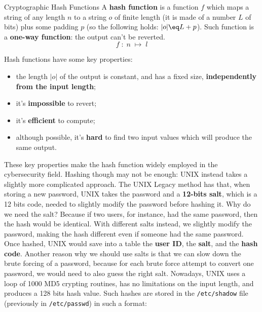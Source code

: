 \begin{definition}{Cryptographic Hash Functions}
    A \textbf{hash function} is a function $f$ which maps a string of any length $n$ to a string $o$ of finite length (it is made of a number $L$ of bits) plus some padding $p$ (so the following holds: $|o| \eq L + p$). Such function is a \textbf{one-way function}: the output can't be reverted.
    \[ f \; : \; n \; \longmapsto \; l \]
\end{definition}

Hash functions have some key properties:
\begin{itemize}
    \item the length $|o|$ of the output is constant, and has a fixed size, \textbf{independently from the input length};
    \item it's \textbf{impossible} to revert;
    \item it's \textbf{efficient} to compute;
    \item although possible, it's \textbf{hard} to find two input values which will produce the same output.
\end{itemize}

These key properties make the hash function widely employed in the cybersecurity field. Hashing though may not be enough: UNIX instead takes a slightly more complicated approach.
\nwl
The UNIX Legacy method has that, when storing a new password, UNIX takes the password and a \textbf{12-bits salt}, which is a 12 bits code, needed to slightly modify the password before hashing it. Why do we need the salt? Because if two users, for instance, had the same password, then the hash would be identical. With different salts instead, we slightly modify the password, making the hash different even if someone had the same password. Once hashed, UNIX would save into a table the \textbf{user ID}, the \textbf{salt}, and the \textbf{hash code}.
\nwl
Another reason why we should use salts is that we can slow down the brute forcing of a password, because for each brute force attempt to convert one password, we would need to also guess the right salt.
\nwl
Nowadays, UNIX uses a loop of 1000 MD5 crypting routines, has no limitations on the input length, and produces a 128 bits hash value. Such hashes are stored in the \verb|/etc/shadow| file (previously in \verb|/etc/passwd|) in such a format:

